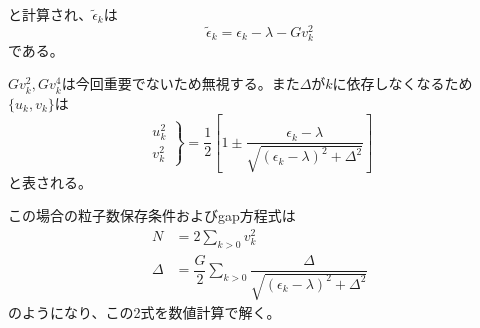 \documentclass[a4paper,11pt]{jsreport}
\begin{document}
  と計算され、\(\tilde{\epsilon}_k\)は
  \begin{equation}
      \tilde{\epsilon}_k=\epsilon_k -\lambda - Gv_k^2
  \end{equation}
  である。\par
  \(Gv_k^2, Gv_k^4\)は今回重要でないため無視する。また\(\Delta\)が\(k\)に依存しなくなるため\(\{u_k,v_k\}\)は
  \begin{equation}
      \left.\begin{aligned}
        u_k^2\\
        v_k^2
      \end{aligned}\right\}=
      \frac{1}{2}\left[
        1\pm\frac{\epsilon_k - \lambda}{\sqrt{(\epsilon_k-\lambda)^2+\Delta^2}}
      \right]
  \end{equation}
  と表される。\par
  この場合の粒子数保存条件およびgap方程式は
  \begin{align}
      N       &=  2\sum_{k>0}v_k^2 \label{number1}\\
      \Delta  &=  \dfrac{G}{2}\sum_{k>0}\dfrac{\Delta}{\sqrt{(\epsilon_k-\lambda)^2+\Delta^2}}\label{Delta2}
  \end{align}
  のようになり、この2式を数値計算で解く。

\end{document}
